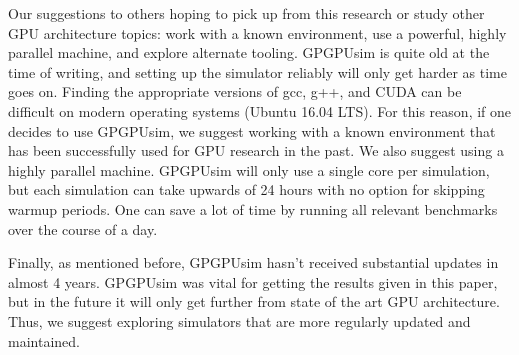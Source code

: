 Our suggestions to others hoping to pick up from this research or study other GPU architecture topics: work with a known environment, use a powerful, highly parallel machine, and explore alternate tooling. GPGPUsim is quite old at the time of writing, and setting up the simulator reliably will only get harder as time goes on. Finding the appropriate versions of gcc, g++, and CUDA can be difficult on modern operating systems (Ubuntu 16.04 LTS). For this reason, if one decides to use GPGPUsim, we suggest working with a known environment that has been successfully used for GPU research in the past. We also suggest using a highly parallel machine. GPGPUsim will only use a single core per simulation, but each simulation can take upwards of 24 hours with no option for skipping warmup periods. One can save a lot of time by running all relevant benchmarks over the course of a day.

Finally, as mentioned before, GPGPUsim hasn't received substantial updates in almost 4 years. GPGPUsim was vital for getting the results given in this paper, but in the future it will only get further from state of the art GPU architecture. Thus, we suggest exploring simulators that are more regularly updated and maintained.
